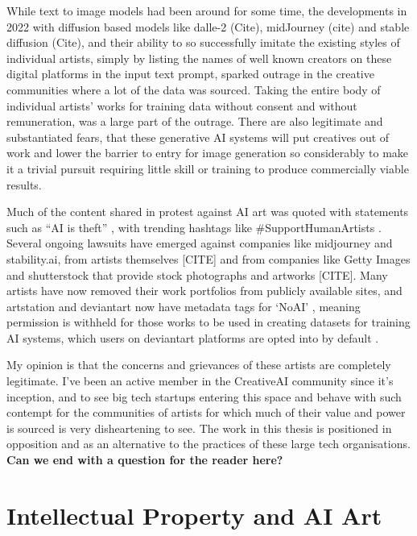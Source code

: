 While text to image models had been around for some time, the developments in 2022 with diffusion based models like dalle-2 (Cite), midJourney (cite) and stable diffusion (Cite), and their ability to so successfully imitate the existing styles of individual artists, simply by listing the names of well known creators on these digital platforms in the input text prompt, sparked outrage in the creative communities where a lot of the data was sourced. 
Taking the entire body of individual artists' works for training data without consent and without remuneration, was a large part of the outrage.
There are also legitimate and substantiated fears, that these generative AI systems will put creatives out of work and lower the barrier to entry for image generation so considerably to make it a trivial pursuit requiring little skill or training to produce commercially viable results.


Much of the content shared in protest against AI art was quoted with statements such as “AI is theft” \citep{whiddington2022backlash}, with trending hashtags like \#SupportHumanArtists \citep{zakuga2022theft}. 
Several ongoing lawsuits have emerged against companies like midjourney and stability.ai, from artists themselves [CITE] and from companies like Getty Images and shutterstock that provide stock photographs and artworks [CITE]. 
Many artists have now removed their work portfolios from publicly available sites, and artstation and deviantart now have metadata tags for ‘NoAI’ \citep{artstation2022noai}, meaning permission is withheld for those works to be used in creating datasets for training AI systems, which users on deviantart platforms are opted into by default \citep{deviantart2022optout}. 

My opinion is that the concerns and grievances of these artists are completely legitimate. 
I've been an active member in the CreativeAI community since it’s inception, and to see big tech startups entering this space and behave with such contempt for the communities of artists for which much of their value and power is sourced is very disheartening to see. 
The work in this thesis is positioned in opposition and as an alternative to the practices of these large tech organisations. 
\textbf{Can we end with a question for the reader here?}

\section{Intellectual Property and AI Art}

